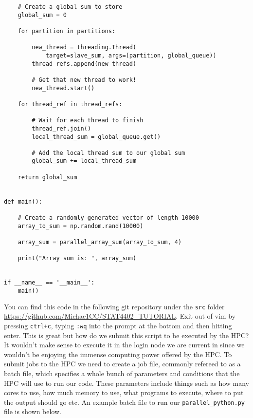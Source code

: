 \begin{verbatim}
    # Create a global sum to store
    global_sum = 0

    for partition in partitions:

        new_thread = threading.Thread(
            target=slave_sum, args=(partition, global_queue))
        thread_refs.append(new_thread)

        # Get that new thread to work!
        new_thread.start()

    for thread_ref in thread_refs:

        # Wait for each thread to finish
        thread_ref.join()
        local_thread_sum = global_queue.get()

        # Add the local thread sum to our global sum
        global_sum += local_thread_sum

    return global_sum


def main():

    # Create a randomly generated vector of length 10000
    array_to_sum = np.random.rand(10000)

    array_sum = parallel_array_sum(array_to_sum, 4)

    print("Array sum is: ", array_sum)


if __name__ == '__main__':
    main()
\end{verbatim}
You can find this code in the following git repository under the \texttt{src} folder \url{https://github.com/Michae1CC/STAT4402_TUTORIAL}. Exit out of vim by pressing \texttt{ctrl+c}, typing \texttt{:wq} into the prompt at the bottom and then hitting enter. This is great but how do we submit this script to be executed by the HPC? It wouldn't make sense to execute it in the login node we are current in since we wouldn't be enjoying the immense computing power offered by the HPC. To submit jobs to the HPC we need to create a job file, commonly refereed to as a batch file, which specifies a whole bunch of parameters and conditions that the HPC will use to run our code. These parameters include things such as how many cores to use, how much memory to use, what programs to execute, where to put the output should go etc. An example batch file to run our \texttt{parallel\_python.py} file is shown below.
